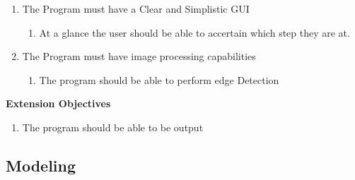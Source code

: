\begin{flushleft}
\begin{enumerate}
            \item The Program must have a Clear and Simplistic GUI
            \begin{enumerate}
                \item At a glance the user should be able to accertain which step they are at.
            \end{enumerate}

            \item The Program must have image processing capabilities
            \begin{enumerate}
                \item The program should be able to perform edge Detection
            \end{enumerate}
            \bk          
        \end{enumerate}  
        
        \vspace{1cm}
        \centerline{\large\textbf{Extension Objectives}}
        \vspace{1cm}

        \begin{enumerate}[resume]
            \item The program should be able to be output
        \end{enumerate}

        \bk

        \subsection{Modeling}
        \bk

\end{flushleft}